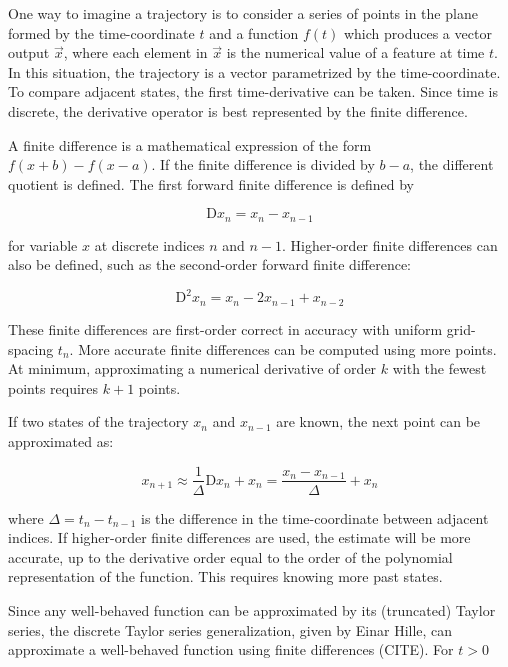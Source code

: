 \documentclass{article}
\begin{document}
One way to imagine a trajectory is to consider a series of points in the plane formed by the time-coordinate $t$
and a function $f(t)$ which produces a vector output $\vec{x}$,
where each element in $\vec{x}$ is the numerical value of a feature at time $t$.
In this situation, the trajectory is a vector parametrized by the time-coordinate.
To compare adjacent states, the first time-derivative can be taken.
Since time is discrete, the derivative operator is best represented by the finite difference.

A finite difference is a mathematical expression of the form $f(x + b) - f(x - a)$.
If the finite difference is divided by $b-a$, the different quotient is defined.
The first forward finite difference is defined by

\begin{equation}
  \mathrm{D}x_n = x_n - x_{n-1}
\end{equation}

for variable $x$ at discrete indices $n$ and $n-1$.
Higher-order finite differences can also be defined, such as the second-order forward finite difference:

\begin{equation}
  \mathrm{D}^2 x_n = x_n - 2 x_{n-1} + x_{n-2}
\end{equation}

These finite differences are first-order correct in accuracy with uniform grid-spacing $t_n$.
More accurate finite differences can be computed using more points.
At minimum, approximating a numerical derivative of order $k$ with the fewest points requires $k+1$ points.

If two states of the trajectory $x_n$ and $x_{n-1}$ are known, the next point can be approximated as:

\begin{equation}
  x_{n+1} \approx \frac{1}{\Delta} \mathrm{D}x_n + x_n = \frac{x_n - x_{n-1}}{\Delta} + x_n
\end{equation}

where $\Delta = t_n - t_{n-1}$ is the difference in the time-coordinate between adjacent indices.
If higher-order finite differences are used, the estimate will be more accurate,
up to the derivative order equal to the order of the polynomial representation of the function.
This requires knowing more past states.

Since any well-behaved function can be approximated by its (truncated) Taylor series,
the discrete Taylor series generalization, given by Einar Hille,
can approximate a well-behaved function using finite differences (CITE).
For $t > 0$
\end{document}
